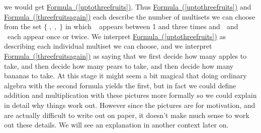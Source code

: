 \documentclass[10pt,]{book}
\theoremstyle{plain}
\theoremstyle{definition}
\theoremstyle{definition}
\numberwithin{equation}{chapter}
\newcommand{\apple}{\text{🍎}}
\newcommand{\ap}{\apple}
\newcommand{\banana}{\text{🍌}}
\newcommand{\ba}{\banana}
\newcommand{\pear}{\text{🍐}}
\newcommand{\pe}{\pear}
\begin{document}
we would get \hyperref[uptothreefruits]{Formula~(\ref{uptothreefruits})}. Thus \hyperref[uptothreefruits]{Formula~(\ref{uptothreefruits})} and \hyperref[threefruitsagain]{Formula~(\ref{threefruitsagain})} each describe the number of multisets we can choose from the set \(\{\ap,\pe,\ba\}\) in which \(\apple\)~appears between 1 and three times and \(\pear\) and \(\banana\)~each appear once or twice. We interpret \hyperref[uptothreefruits]{Formula~(\ref{uptothreefruits})} as describing each individual multiset we can choose, and we interpret \hyperref[threefruitsagain]{Formula~(\ref{threefruitsagain})} as saying that we first decide how many apples to take, and then decide how many pears to take, and then decide how many bananas to take. At this stage it might seem a bit magical that doing ordinary algebra with the second formula yields the first, but in fact we could define addition and multiplication with these pictures more formally so we could explain in detail why things work out. However since the pictures are for motivation, and are actually difficult to write out on paper, it doesn't make much sense to work out these details. We will see an explanation in another context later on.%
\typeout{************************************************}
\typeout{************************************************}
\end{document}
